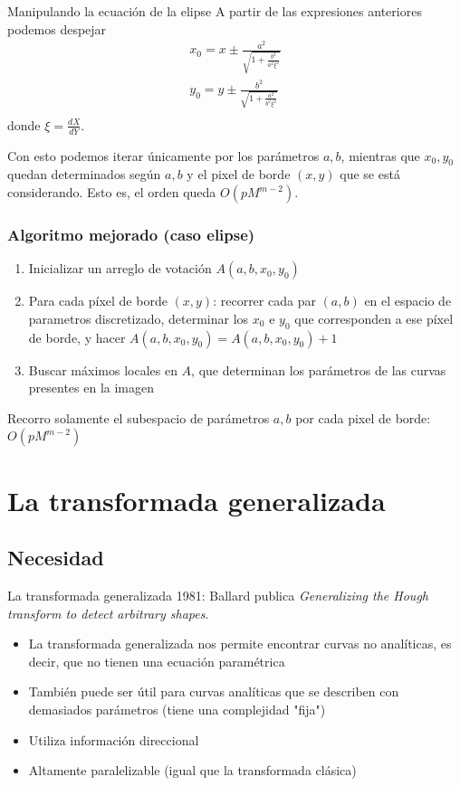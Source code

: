 \documentclass{beamer}
\begin{document}
\begin{frame}{Manipulando la ecuación de la elipse}
A partir de las expresiones anteriores podemos despejar
\begin{align*}
x_0 = x \pm \frac{a^2}{\sqrt{1 + \frac{b^2}{a^2\xi^2} }} \\
y_0 = y \pm \frac{b^2}{\sqrt{1 + \frac{a^2}{b^2\xi^2} }} \\
\end{align*}
donde $\xi = \frac{dX}{dY}$.

Con esto podemos iterar únicamente por los parámetros $a, b$, mientras que $x_0, y_0$ quedan determinados según $a,b$ y el pixel de borde $(x,y)$ que se está considerando. Esto es, el orden queda $O(pM^{m-2})$.
\end{frame}

\begin{frame}
\frametitle{Algoritmo mejorado (caso elipse)}
\begin{enumerate}
    \item Inicializar un arreglo de votación $A(a, b, x_0, y_0)$
    \item Para cada píxel de borde $(x,y)$: recorrer cada par ${(a,b)}$ en el espacio de parametros discretizado, determinar los $x_0$ e $y_0$ que corresponden a ese píxel de borde, y hacer $A(a,b,x_0,y_0) = A(a,b,x_0,y_0) + 1$
    \item Buscar máximos locales en $A$, que determinan los parámetros de las curvas presentes en la imagen 
\end{enumerate}
Recorro solamente el subespacio de parámetros $a,b$ por cada pixel de borde: $O(pM^{m-2})$
\end{frame}

\section{La transformada generalizada}
\subsection{Necesidad}
\begin{frame}{La transformada generalizada}
1981: Ballard publica \textit{Generalizing the Hough transform to detect arbitrary shapes}.
    \begin{itemize}
        \item La transformada generalizada nos permite encontrar curvas no analíticas, es decir, que no tienen una ecuación paramétrica
        \item También puede ser útil para curvas analíticas que se describen con demasiados parámetros (tiene una complejidad "fija") 
        \item Utiliza información direccional
        \item Altamente paralelizable (igual que la transformada clásica)
    \end{itemize}
\end{frame}
\end{document}
